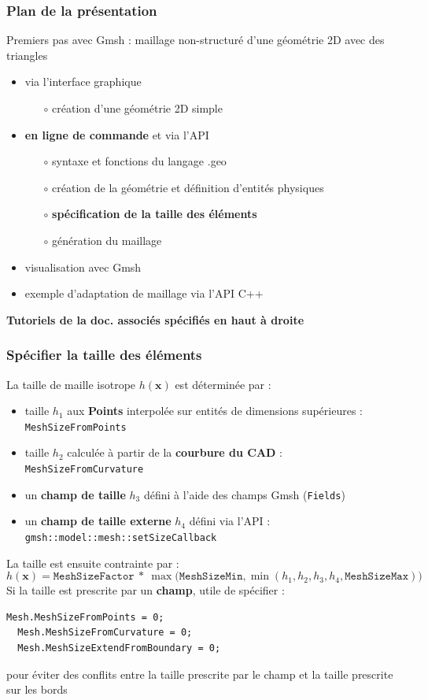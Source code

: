 \documentclass[aspectratio=169]{beamer}
\begin{document}
\begin{frame}[fragile]
\frametitle{Plan de la présentation}
Premiers pas avec Gmsh : maillage non-structuré d'une géométrie 2D avec des triangles
\begin{itemize}
  \item via l'interface graphique
  \begin{itemize}
    \item[$\circ$] création d'une géométrie 2D simple
  \end{itemize}
  \item \textbf{en ligne de commande} et via l'API
  \begin{itemize}
    \item[$\circ$] syntaxe et fonctions du langage .geo
    \item[$\circ$] création de la géométrie et définition d'entités physiques
    \item[$\circ$] \textbf{spécification de la taille des éléments}
    \item[$\circ$] génération du maillage
  \end{itemize}
  \item visualisation avec Gmsh
  \item exemple d'adaptation de maillage via l'API C++
\end{itemize}
{\color{blue} \textbf{Tutoriels de la doc. associés spécifiés en haut à droite}}
\end{frame}

\begin{frame}[fragile]
\frametitle{Spécifier la taille des éléments}
\footnotesize
La taille de maille isotrope $h(\mathbf{x})$ est déterminée par :
  \begin{itemize}
    \item taille $h_1$ aux \textbf{Points} interpolée sur entités de dimensions supérieures : \texttt{MeshSizeFromPoints}
    \item taille $h_2$ calculée à partir de la \textbf{courbure du CAD} : \texttt{MeshSizeFromCurvature}
    \item un \textbf{champ de taille} $h_3$ défini à l'aide des champs Gmsh (\texttt{Fields})
    \item un \textbf{champ de taille externe} $h_4$ défini via l'API : \texttt{gmsh::model::mesh::setSizeCallback}
  \end{itemize}
  La taille est ensuite contrainte par :
  \begin{equation*}
    h(\mathbf{x}) = \texttt{MeshSizeFactor}~*~\max\biggr( \texttt{MeshSizeMin}, \min\left( h_1, h_2, h_3, h_4, \texttt{MeshSizeMax}\right) \biggr)
  \end{equation*}
  Si la taille est prescrite par un \textbf{champ}, utile de spécifier :
  \begin{lstlisting}[belowskip=0.5mm]
  Mesh.MeshSizeFromPoints = 0;
  Mesh.MeshSizeFromCurvature = 0;
  Mesh.MeshSizeExtendFromBoundary = 0;
  \end{lstlisting}
  pour éviter des conflits entre la taille prescrite par le champ et la taille prescrite sur les bords
\end{frame}
\end{document}
